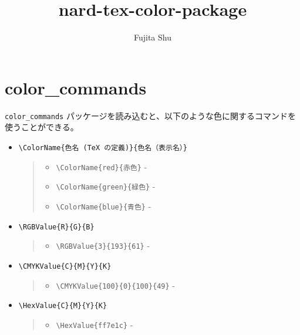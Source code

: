 \documentclass[oneside,10pt,a4paper]{jsarticle}
\title{nard-tex-color-package}
\author{Fujita Shu}
\begin{document}
  \maketitle

  \section{color\_commands}

  \verb|color_commands| パッケージを読み込むと、以下のような色に関するコマンドを使うことができる。

  \begin{itemize}
    \item \verb|\ColorName{色名 (TeX の定義)}{色名（表示名）}|
      \begin{quote}
        \begin{itemize}
          \item \verb|\ColorName{red}{赤色}| - 
          \item \verb|\ColorName{green}{緑色}| - 
          \item \verb|\ColorName{blue}{青色}| - 
        \end{itemize}
      \end{quote}
    \item \verb|\RGBValue{R}{G}{B}|
      \begin{quote}
        \begin{itemize}
          \item \verb|\RGBValue{3}{193}{61}| - 
        \end{itemize}
      \end{quote}
    \item \verb|\CMYKValue{C}{M}{Y}{K}|
      \begin{quote}
        \begin{itemize}
          \item \verb|\CMYKValue{100}{0}{100}{49}| - 
        \end{itemize}
      \end{quote}
    \item \verb|\HexValue{C}{M}{Y}{K}|
      \begin{quote}
        \begin{itemize}
          \item \verb|\HexValue{ff7e1c}| - 
        \end{itemize}
      \end{quote}
  \end{itemize}
\end{document}
